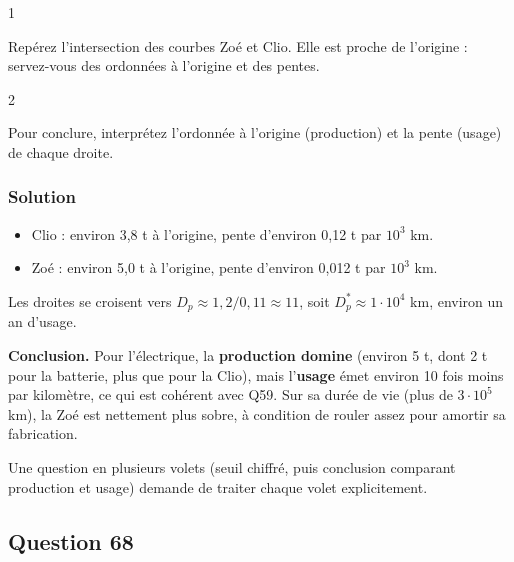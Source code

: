\documentclass[11pt,a4paper]{article}
\providecommand{\tightlist}{\setlength{\itemsep}{0pt}\setlength{\parskip}{0pt}}
\begin{document}
\begin{indication}{1}

Repérez l'intersection des courbes Zoé et Clio. Elle est proche de l'origine : servez-vous des ordonnées à l'origine et des pentes.

\end{indication}

\begin{indication}{2}

Pour conclure, interprétez l'ordonnée à l'origine (production) et la pente (usage) de chaque droite.

\end{indication}

\hypertarget{solution-66}{%
\subsubsection{Solution}\label{solution-66}}

\begin{itemize}
\tightlist
\item
  Clio : environ 3,8 t à l'origine, pente d'environ 0,12 t par \(10^3\) km.
\item
  Zoé : environ 5,0 t à l'origine, pente d'environ 0,012 t par \(10^3\) km.
\end{itemize}

Les droites se croisent vers \(D_p\approx1{,}2/0{,}11\approx11\), soit \(D_p^*\approx1\cdot10^4\) km, environ un an d'usage.

\textbf{Conclusion.} Pour l'électrique, la \textbf{production domine} (environ 5 t, dont 2 t pour la batterie, plus que pour la Clio), mais l'\textbf{usage} émet environ 10 fois moins par kilomètre, ce qui est cohérent avec Q59. Sur sa durée de vie (plus de \(3\cdot10^5\) km), la Zoé est nettement plus sobre, à condition de rouler assez pour amortir sa fabrication.

\begin{jury}

Une question en plusieurs volets (seuil chiffré, puis conclusion comparant production et usage) demande de traiter chaque volet explicitement.

\end{jury}

\hypertarget{question-68}{%
\subsection{Question 68}\label{question-68}}
\end{document}
